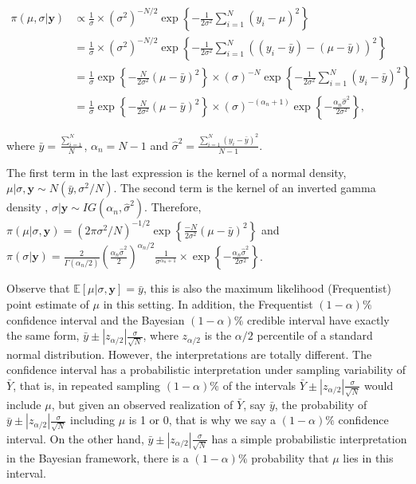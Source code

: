 \begin{align*}
	\pi(\mu,\sigma|\mathbf{y})&\propto \frac{1}{\sigma}\times (\sigma^2)^{-N/2}\exp\left\{-\frac{1}{2\sigma^2}\sum_{i=1}^N (y_i-\mu)^2\right\}\\
	&= \frac{1}{\sigma}\times (\sigma^2)^{-N/2}\exp\left\{-\frac{1}{2\sigma^2}\sum_{i=1}^N ((y_i-\bar{y}) - (\mu-\bar{y}))^2\right\}\\
	&=  \frac{1}{\sigma}\exp\left\{-\frac{N}{2\sigma^2}(\mu-\bar{y})^2\right\}\times (\sigma)^{-N}\exp\left\{-\frac{1}{2\sigma^2}\sum_{i=1}^N (y_i-\bar{y})^2\right\}\\
	&=  \frac{1}{\sigma}\exp\left\{-\frac{N}{2\sigma^2}(\mu-\bar{y})^2\right\}\times (\sigma)^{-(\alpha_n+1)}\exp\left\{-\frac{\alpha_n\hat{\sigma}^2}{2\sigma^2}\right\},	
\end{align*}

where $\bar{y}=\frac{\sum_{i=1}^N}{N}$, $\alpha_n=N-1$ and $\hat{\sigma}^2=\frac{\sum_{i=1}^N (y_i-\bar{y})^2}{N-1}$.

The first term in the last expression is the kernel of a normal density, $\mu|\sigma,\mathbf{y}\sim N(\bar{y},\sigma^2/N)$. The second term is the kernel of an inverted gamma density \cite{zellner1996introduction}, $\sigma|\mathbf{y}\sim IG(\alpha_n,\hat{\sigma}^2)$. Therefore, $\pi(\mu|\sigma,\mathbf{y})=(2\pi\sigma^2/N)^{-1/2}\exp\left\{\frac{-N}{2\sigma^2}(\mu-\bar{y})^2\right\}$ and $\pi(\sigma|\mathbf{y})=\frac{2}{\Gamma(\alpha_n/2)}\left(\frac{\alpha_n\hat{\sigma}^2}{2}\right)^{\alpha_n/2}\frac{1}{\sigma^{\alpha_n+1}}\times\exp\left\{-\frac{\alpha_n\hat{\sigma}^2}{2\sigma^2}\right\}$.

Observe that $\mathbb{E}[\mu|\sigma,\mathbf{y}]=\bar{y}$, this is also the maximum likelihood (Frequentist) point estimate of $\mu$ in this setting. In addition, the Frequentist $(1-\alpha)\%$ confidence interval and the Bayesian $(1-\alpha)\%$ credible interval have exactly the same form, $\bar{y}\pm |z_{\alpha/2}|\frac{\sigma}{\sqrt{N}}$, where $z_{\alpha/2}$ is the $\alpha/2$ percentile of a standard normal distribution. However, the interpretations are totally different. The confidence interval has a probabilistic interpretation under sampling variability of $\bar{Y}$, that is, in repeated sampling $(1-\alpha)\%$ of the intervals $\bar{Y}\pm |z_{\alpha/2}|\frac{\sigma}{\sqrt{N}}$ would include $\mu$, but given an observed realization of $\bar{Y}$, say $\bar{y}$, the probability of $\bar{y}\pm |z_{\alpha/2}|\frac{\sigma}{\sqrt{N}}$ including $\mu$ is 1 or 0, that is why we say a $(1-\alpha)\%$ confidence interval. On the other hand, $\bar{y}\pm |z_{\alpha/2}|\frac{\sigma}{\sqrt{N}}$ has a simple probabilistic interpretation in the Bayesian framework, there is a $(1-\alpha)\%$ probability that $\mu$ lies in this interval.

